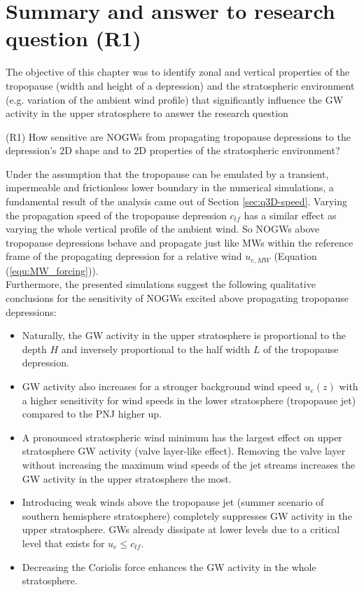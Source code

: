 \section{Summary and answer to research question (R1)}
\label{sec:q3D-summary}
The objective of this chapter was to identify zonal and vertical properties of the tropopause (width and height of a depression) and the stratospheric environment (e.g. variation of the ambient wind profile) that significantly influence the GW activity in the upper stratosphere to answer the research question
\begin{tcolorbox}[]
    (R1) How sensitive are NOGWs from propagating tropopause depressions to the depression's 2D shape and to 2D properties of the stratospheric environment?
\end{tcolorbox}
Under the assumption that the tropopause can be emulated by a transient, impermeable and frictionless lower boundary in the numerical simulations, a fundamental result of the analysis came out of Section \ref{sec:q3D-speed}. Varying the propagation speed of the tropopause depression $c_{tf}$ has a similar effect as varying the whole vertical profile of the ambient wind. So NOGWs above tropopause depressions behave and propagate just like MWs within the reference frame of the propagating depression for a relative wind $u_{e,MW}$ (Equation (\ref{equ:MW_forcing})). \\
Furthermore, the presented simulations suggest the following qualitative conclusions for the sensitivity of NOGWs excited above propagating tropopause depressions:
\begin{itemize}
    \item Naturally, the GW activity in the upper stratosphere is proportional to the depth $H$ and inversely proportional to the half width $L$ of the tropopause depression.
    \item GW activity also increases for a stronger background wind speed $u_e(z)$ with a higher sensitivity for wind speeds in the lower stratosphere (tropopause jet) compared to the PNJ higher up.
    \item A pronounced stratospheric wind minimum has the largest effect on upper stratosphere GW activity (valve layer-like effect). Removing the valve layer without increasing the maximum wind speeds of the jet streams increases the GW activity in the upper stratosphere the most. 
    \item Introducing weak winds above the tropopause jet (summer scenario of southern hemisphere stratosphere) completely suppresses GW activity in the upper stratosphere. GWs already dissipate at lower levels due to a critical level that exists for $u_e \leq c_{tf}$.
    \item Decreasing the Coriolis force enhances the GW activity in the whole stratosphere.
\end{itemize}
